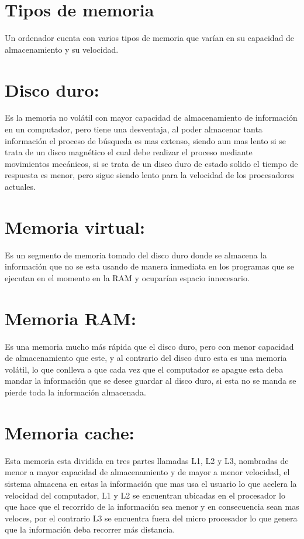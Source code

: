 \documentclass{article}
\begin{document}
\section{Tipos de memoria} \label{contenido}


Un ordenador cuenta con varios tipos de memoria que varían en su capacidad de almacenamiento
y su velocidad. 


\section{Disco duro: }
Es la memoria no volátil con mayor capacidad de almacenamiento de información en un computador, pero tiene una desventaja, al poder almacenar tanta información el proceso de búsqueda es mas extenso, siendo aun mas lento si se trata de un disco magnético el cual debe realizar el proceso mediante movimientos mecánicos, si se trata de un disco duro de estado solido el tiempo de respuesta es menor, pero sigue siendo lento para la velocidad de los procesadores actuales. 

\section{Memoria virtual: }

Es un segmento de memoria tomado del disco duro donde se almacena la información que no se esta usando de manera inmediata en los programas que se ejecutan en el momento en la RAM y ocuparían espacio innecesario. 

\section{Memoria RAM: }

Es una memoria mucho más rápida que el disco duro, pero con menor capacidad de almacenamiento que este, y al contrario del disco duro esta es una memoria volátil, lo que conlleva a que cada vez que el computador se apague esta deba mandar la información que se desee guardar al disco duro, si esta no se manda se pierde toda la información almacenada.   

\section{Memoria cache: }

Esta memoria esta dividida en tres partes llamadas L1, L2 y L3, nombradas de menor a mayor capacidad de almacenamiento y de mayor a menor velocidad, el sistema almacena en estas la información que mas usa el usuario lo que acelera la velocidad del computador, L1 y L2 se encuentran ubicadas en el procesador lo que hace que el recorrido de la información sea menor  y en consecuencia sean mas veloces, por el contrario L3 se encuentra fuera del micro procesador lo que genera que la información deba recorrer más distancia. 
\end{document}
